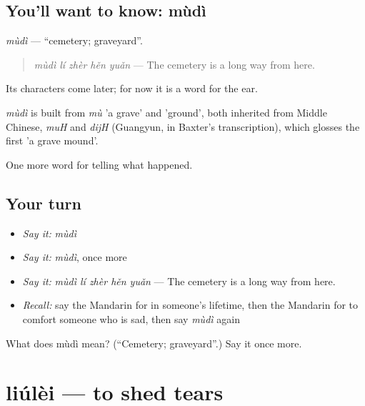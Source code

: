 \subsection*{You'll want to know: mùdì}
\emph{mùdì} — \textquotedblleft{}cemetery; graveyard\textquotedblright{}.

\begin{quote}
\emph{mùdì lí zhèr hěn yuǎn} — The cemetery is a long way from here.
\end{quote}

Its characters come later; for now it is a word for the ear.

\begin{cousinweb}
\emph{mùdì} is built from \emph{mù} 'a grave' and  'ground', both inherited from Middle Chinese, \emph{muH} and \emph{dijH} (Guangyun, in Baxter's transcription), which glosses the first 'a grave mound'.
\end{cousinweb}

\begin{grammarlens}[title={What you've built}]
One more word for telling what happened.
\end{grammarlens}

\subsection*{Your turn}
\begin{itemize}
\raggedright
  \item \emph{Say it:} \emph{mùdì}
  \item \emph{Say it:} \emph{mùdì}, once more
  \item \emph{Say it:} \emph{mùdì lí zhèr hěn yuǎn} — The cemetery is a long way from here.
  \item \emph{Recall:} say the Mandarin for in someone's lifetime, then the Mandarin for to comfort someone who is sad, then say \emph{mùdì} again
\end{itemize}

\begin{tcolorbox}[breakable,colback=teal!4,colframe=teal!35!black,title={Before you move on}]
What does mùdì mean? (\textquotedblleft{}Cemetery; graveyard\textquotedblright{}.) Say it once more.
\end{tcolorbox}
\section[liúlèi]{liúlèi — to shed tears}

\label{lesson:ZH-C314-liulei}



